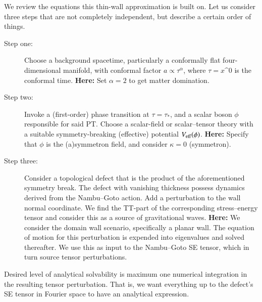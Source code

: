 









We review the equations this thin-wall approximation is built on. %
Let us consider three steps that are not completely independent, but describe a certain order of things.
\begin{description}
    \item[Step one:] Choose a background spacetime, particularly a conformally flat four-dimensional manifold, with conformal factor $a\propto \tau^\alpha$, where $\tau=x\^0$ is the conformal time. \textbf{Here:} Set $\alpha=2$ to get matter domination.
    \item[Step two:] Invoke a (first-order) phase transition at $\tau = \tau_\ast$, and a scalar boson $\phi$ responsible for said PT. Choose a scalar-field or scalar--tensor theory with a suitable symmetry-breaking (effective) potential $V_\mathrm{eff}(\phi)$. \textbf{Here:} Specify that $\phi$ is the (a)symmetron field, and consider $\kappa=0$ (symmetron).
    \item[Step three:] Consider a topological defect that is the product of the aforementioned symmetry break. The defect with vanishing thickness possess dynamics derived from the Nambu--Goto action. Add a perturbation to the wall normal coordinate. We find the TT-part of the corresponding stress--energy tensor and consider this as a source of gravitational waves. \textbf{Here:} We consider the domain wall scenario, specifically a planar wall. The equation of motion for this perturbation is expended into eigenvalues and solved thereafter. We use this as input to the Nambu--Goto SE tensor, which in turn source tensor perturbations.
\end{description}
Desired level of analytical solvability is maximum one numerical integration in the resulting tensor perturbation. That is, we want everything up to the defect's SE tensor in Fourier space to have an analytical expression. 

